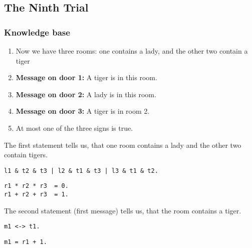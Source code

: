 \subsection{The Ninth Trial}

\subsubsection{Knowledge base}

\begin{enumerate}

\item Now we have three rooms: one contains a lady, and the other two contain a tiger 

\item \textbf{Message on door 1:} A tiger is in this room.

\item \textbf{Message on door 2:} A lady is in this room.

\item \textbf{Message on door 3:} A tiger is in room 2.


\item At most one of the three signs is true.

\end{enumerate}


The first statement tells us, that one room contains a lady and the other two contain tigers.


\begin{multicols}{2}
\begin{lstlisting}[numbers=none,title=Propositional logic]
l1 & t2 & t3 | l2 & t1 & t3 | l3 & t1 & t2.

\end{lstlisting}

\begin{lstlisting}[numbers=none,title=Modular arithmetics]
r1 * r2 * r3  = 0.
r1 + r2 + r3  = 1.
\end{lstlisting}
\end{multicols}

The second statement (first message) tells us, that the room contains a tiger.

\begin{multicols}{2}

\begin{lstlisting}[numbers=none,title=Propositional logic]
m1 <-> t1.
\end{lstlisting}

\begin{lstlisting}[numbers=none,title=Modular arithmetic]
m1 = r1 + 1.
\end{lstlisting}

\end{multicols}


